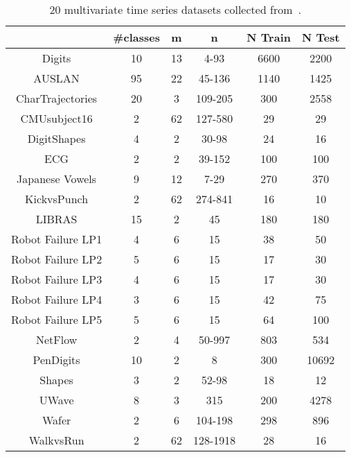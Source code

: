 \documentclass[sigconf]{acmart}
\begin{document}
\begin{table}[t]
	\begin{centering}
		\begin{tabular}{cccccc}
			& {\#classes} & {m} & {n} & {N Train} & {N Test}\tabularnewline
			\midrule 
			\midrule 
			{Digits} & {10} & {13} & {4-93} & {6600} & {2200}\tabularnewline
			\midrule 
			{AUSLAN} & {95} & {22} & {45-136} & {1140} & {1425}\tabularnewline
			\midrule 
			{CharTrajectories} & {20} & {3} & {109-205} & {300} & {2558}\tabularnewline
			\midrule 
			{CMUsubject16} & {2} & {62} & {127-580} & {29} & {29}\tabularnewline
			\midrule 
			{DigitShapes} & 4 & {2} & {30-98} & {24} & {16}\tabularnewline
			\midrule 
			{ECG} & {2} & {2} & {39-152} & {100} & {100}\tabularnewline
			\midrule 
			{Japanese Vowels} & {9} & {12} & {7-29} & {270} & {370}\tabularnewline
			\midrule 
			{KickvsPunch} & {2} & {62} & {274-841} & {16} & {10}\tabularnewline
			\midrule 
			{LIBRAS} & {15} & {2} & {45} & {180} & {180}\tabularnewline
			\midrule 
			{Robot Failure LP1} & {4} & {6} & {15} & {38} & {50}\tabularnewline
			\midrule 
			{Robot Failure LP2} & {5} & {6} & {15} & {17} & {30}\tabularnewline
			\midrule 
			{Robot Failure LP3} & {4} & {6} & {15} & {17} & {30}\tabularnewline
			\midrule 
			{Robot Failure LP4} & {3} & {6} & {15} & {42} & {75}\tabularnewline
			\midrule 
			{Robot Failure LP5} & {5} & {6} & {15} & {64} & {100}\tabularnewline
			\midrule 
			{NetFlow} & {2} & {4} & {50-997} & {803} & {534}\tabularnewline			
			\midrule 
			{PenDigits} & {10} & {2} & {8} & {300} & {10692}\tabularnewline
			\midrule 
			{Shapes} & {3} & {2} & {52-98} & {18} & {12}\tabularnewline
			\midrule 			
			{UWave} & {8} & {3} & {315} & {200} & {4278}\tabularnewline
			\midrule 
			{Wafer} & {2} & {6} & {104-198} & {298} & {896}\tabularnewline
			\midrule 
			{WalkvsRun} & {2} & {62} & {128-1918} & {28} & {16}\tabularnewline
		\end{tabular}
		\par\end{centering}
	\caption{$20$ multivariate time series datasets collected from~\cite{MultivariateTimeSeriesClassification}. \label{tab:Datasets}}
	
\end{table}
\end{document}
